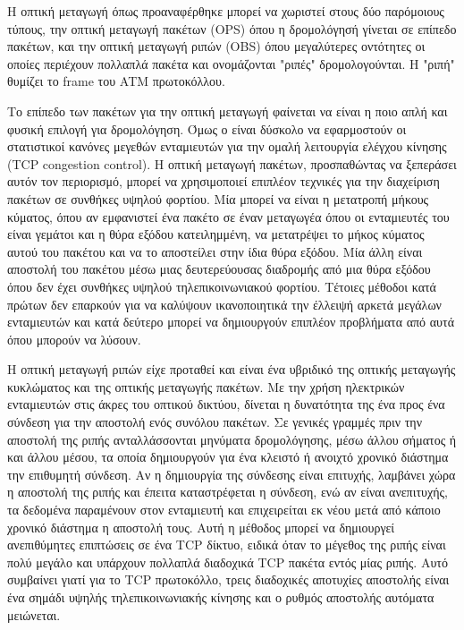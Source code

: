 Η οπτική μεταγωγή όπως προαναφέρθηκε μπορεί να χωριστεί στους δύο
παρόμοιους τύπους, την οπτική μεταγωγή πακέτων (OPS) όπου η
δρομολόγησή γίνεται σε επίπεδο πακέτων, και την οπτική μεταγωγή ριπών
(OBS) όπου μεγαλύτερες οντότητες οι οποίες περιέχουν πολλαπλά πακέτα
και ονομάζονται "ριπές" δρομολογούνται. Η "ριπή" θυμίζει το frame του
ATM πρωτοκόλλου.

Το επίπεδο των πακέτων για την οπτική μεταγωγή φαίνεται να είναι η
ποιο απλή και φυσική επιλογή για δρομολόγηση. Όμως ο είναι δύσκολο να
εφαρμοστούν οι στατιστικοί κανόνες μεγεθών ενταμιευτών για την ομαλή
λειτουργία ελέγχου κίνησης (TCP congestion control). Η οπτική μεταγωγή
πακέτων, προσπαθώντας να ξεπεράσει αυτόν τον περιορισμό, μπορεί να
χρησιμοποιεί επιπλέον τεχνικές για την διαχείριση πακέτων σε συνθήκες
υψηλού φορτίου. Μία μπορεί να είναι η μετατροπή μήκους κύματος, όπου
αν εμφανιστεί ένα πακέτο σε έναν μεταγωγέα όπου οι ενταμιευτές του
είναι γεμάτοι και η θύρα εξόδου κατειλημμένη, να μετατρέψει το μήκος
κύματος αυτού του πακέτου και να το αποστείλει στην ίδια θύρα
εξόδου. Μία άλλη είναι αποστολή του πακέτου μέσω μιας δευτερεύουσας
διαδρομής από μια θύρα εξόδου όπου δεν έχει συνθήκες υψηλού
τηλεπικοινωνιακού φορτίου. Τέτοιες μέθοδοι κατά πρώτων δεν επαρκούν
για να καλύψουν ικανοποιητικά την έλλειψή αρκετά μεγάλων ενταμιευτών
και κατά δεύτερο μπορεί να δημιουργούν επιπλέον προβλήματα από αυτά
όπου μπορούν να λύσουν.

Η οπτική μεταγωγή ριπών είχε προταθεί \cite{} και είναι ένα υβριδικό
της οπτικής μεταγωγής κυκλώματος και της οπτικής μεταγωγής πακέτων. Με
την χρήση ηλεκτρικών ενταμιευτών στις άκρες του οπτικού δικτύου,
δίνεται η δυνατότητα της ένα προς ένα σύνδεση για την αποστολή ενός
συνόλου πακέτων. Σε γενικές γραμμές πριν την αποστολή της ριπής
ανταλλάσσονται μηνύματα δρομολόγησης, μέσω άλλου σήματος ή και άλλου
μέσου, τα οποία δημιουργούν για ένα κλειστό ή ανοιχτό χρονικό διάστημα
την επιθυμητή σύνδεση. Αν η δημιουργία της σύνδεσης είναι επιτυχής,
λαμβάνει χώρα η αποστολή της ριπής και έπειτα καταστρέφεται η σύνδεση,
ενώ αν είναι ανεπιτυχής, τα δεδομένα παραμένουν στον ενταμιευτή και
επιχειρείται εκ νέου μετά από κάποιο χρονικό διάστημα η αποστολή
τους. Αυτή η μέθοδος μπορεί να δημιουργεί ανεπιθύμητες επιπτώσεις σε
ένα TCP δίκτυο, ειδικά όταν το μέγεθος της ριπής είναι πολύ μεγάλο και
υπάρχουν πολλαπλά διαδοχικά TCP πακέτα εντός μίας ριπής. Αυτό
συμβαίνει γιατί για το TCP πρωτοκόλλο, τρεις διαδοχικές αποτυχίες
αποστολής είναι ένα σημάδι υψηλής τηλεπικοινωνιακής κίνησης και ο
ρυθμός αποστολής αυτόματα μειώνεται.

